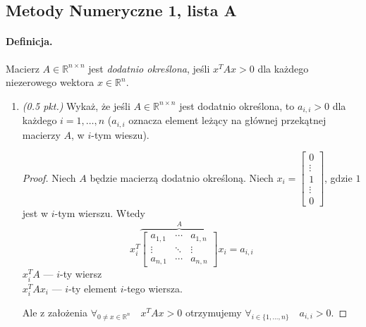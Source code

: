 \documentclass[12pt]{article}
\newcommand{\R}{\mathbb{R}}
\newenvironment{lista}[2][]{\newpage
\begin{center}
    \section[Lista \textbf{#2}]{Metody Numeryczne 1, lista #2}
\end{center}
\bigskip
#1
\begin{enumerate}[label=\textbf{#2\arabic*.}]}{\end{enumerate}}
\newcommand{\zad}[1][0.5]{\item \emph{(#1 pkt.) }}
\begin{document}
\begin{lista}[\paragraph*{Definicja.} Macierz $A\in\R^{n\times n}$ jest \emph{dodatnio określona}, jeśli $x^TAx>0$ dla każdego niezerowego wektora $x\in\R^n$.]{A}
\begin{mdframed}
        \[ \det(A-\lambda I) = \det \begin{bmatrix} 1 - \lambda & 0 \\ 10 & 1 - \lambda \end{bmatrix} = (1-\lambda)^2 = 0 \]
        Wartością własną macierzy A jest $\lambda = 1 > 0$, ale dla wektora $x = \begin{bmatrix} -1 \\ 1 \end{bmatrix}$ mamy
        \[ x^TAx = -8 \leq 0. \]
        Więc macierz $A$ nie jest dodatnio określona.
    \end{mdframed}

    \zad\label{A3} Wykaż, że jeśli $A\in\R^{n\times n}$ jest dodatnio określona, to $a_{i,i} > 0$ dla każdego $i = 1,\dots,n$ ($a_{i,i}$ oznacza element leżący na głównej przekątnej macierzy $A$, w $i$-tym wieszu).

    \begin{mdframed}
        \begin{proof}
            Niech $A$ będzie macierzą dodatnio określoną. Niech $x_i = \begin{bmatrix} 0 \\ \vdots \\ 1 \\ \vdots \\ 0 \end{bmatrix}$, gdzie $1$ jest w $i$-tym wierszu. Wtedy
            \[ x_i^T\overbrace{\begin{bmatrix} a_{1,1} & \cdots & a_{1,n} \\ \vdots & \ddots & \vdots \\ a_{n,1} & \cdots & a_{n,n} \end{bmatrix}}^A x_i = a_{i,i}\]
            $x_i^TA$ --- $i$-ty wiersz\\
            $x_i^TAx_i$ --- $i$-ty element $i$-tego wiersza.

            Ale z założenia $\forall_{0\neq x\in\R^n} \quad x^TAx > 0$ otrzymujemy $\forall_{i \in\{1,\dots,n\}}\quad a_{i,i} > 0$.
        \end{proof}
    \end{mdframed}
\end{lista}
\end{document}
